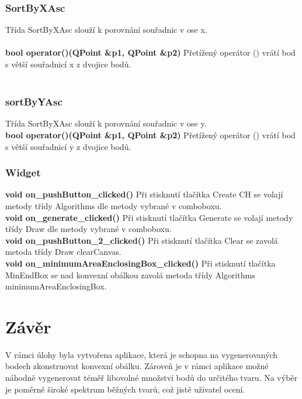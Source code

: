 \documentclass[a4paper, 12pt]{article}
\begin{document}
\subsubsection{SortByXAsc}
Třída SortByXAsc slouží k porovnání souřadnic v ose x.\\
\\

\textbf{bool operator()(QPoint \&p1, QPoint \&p2)}
Přetížený operátor () vrátí bod s větší souřadnicí x z dvojice bodů.\\
\\

\subsubsection{sortByYAsc}
Třída SortByXAsc slouží k porovnání souřadnic v ose y.
\\

\textbf{bool operator()(QPoint \&p1, QPoint \&p2)}
Přetížený operátor () vrátí bod s větší souřadnicí y z dvojice bodů.
\\

\subsubsection{Widget}


\textbf{void on\_pushButton\_clicked()}
Při stisknutí tlačítka Create CH se volají metody třídy Algorithms dle metody vybrané v comboboxu.
\\

\textbf{void on\_generate\_clicked()}
Při stisknutí tlačítka Generate se volají metody třídy Draw dle metody vybrané v comboboxu.
\\

\textbf{void on\_pushButton\_2\_clicked()}
Při stisknutí tlačítka Clear se zavolá metoda třídy Draw clearCanvas.
\\

\textbf{void on\_minimumAreaEnclosingBox\_clicked()}
Při stisknutí tlačítka MinEndBox se nad konvexní obálkou zavolá metoda třídy Algorithms minimumAreaEnclosingBox.
\\

\clearpage
\section{Závěr}
V rámci úlohy byla vytvořena aplikace, která je schopna na vygenerovaných bodech zkonstruovat konvexní obálku. Zároveň je v rámci aplikace možné náhodně vygenerovat téměř libovolné množství bodů do určitého tvaru. Na výběr je poměrně široké spektrum běžných tvarů, což jistě uživatel ocení.
\end{document}
